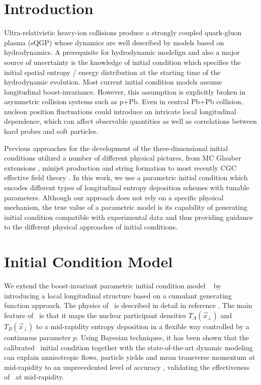 \documentclass[3p,times,twocolumn]{elsarticle}
\begin{document}

\section{Introduction}
\label{Introduction}
Ultra-relativistic heavy-ion collisions produce a strongly coupled quark-gluon plasma (sQGP) whose dynamics are well described by models based on hydrodynamics.
A prerequisite for hydrodynamic modelign and also a major source of uncertainty  is the knowledge of initial condition which specifies the initial spatial entropy / energy distribution at the starting time of the hydrodynamic evolution.
Most current initial condition models assume longitudinal boost-invariance.
However, this assumption is explicitly broken in asymmetric collision systems such as p+Pb.
Even in central Pb+Pb collision, nucleon position fluctuations could introduce an intricate local longitudinal dependence, which can affect observable quantities as well as correlations between hard probes and soft particles.

Previous approaches for the development of the three-dimensional initial conditions utilized a number of different physical pictures, from MC Glauber extensions \cite{Bozek:2015bha}, minijet production and string formation \cite{Wang:1991hta} to most recently CGC effective field theory \cite{Schenke:2016ksl}.
In this work, we use a parametric initial condition which encodes different types of longitudinal entropy deposition schemes with tunable parameters.
Although our approach does not rely on a specific physical mechanism, the true value of a parametric model is its capability of generating initial condition compatible with experimental data and thus providing guidance to the different physical approaches of initial conditions.

\section{Initial Condition Model}
\label{Model}
We extend the boost-invariant parametric initial condition model \trento~\cite{Moreland:2014oya} by introducing a local longitudinal structure based on a cumulant generating function approach.
The physics of \trento~is described in detail in reference \cite{Moreland:2014oya}. The main feature of \trento~is that it maps the nuclear participant densities $T_A(\vec{x}_{\perp})$ and $T_B(\vec{x}_{\perp})$ to a mid-rapidity entropy deposition in a flexible way controlled by a continuous parameter $p$.
Using Bayesian techniques, it has been shown that the calibrated \trento~initial condition together with the state-of-the-art dynamic modeling can explain annisotropic flows, particle yields and mean transverse momentum at mid-rapidity to an unprecedented level of accuracy \cite{Bernhard:2016tnd}, validating the effectiveness of \trento~at mid-rapidity.
\end{document}
